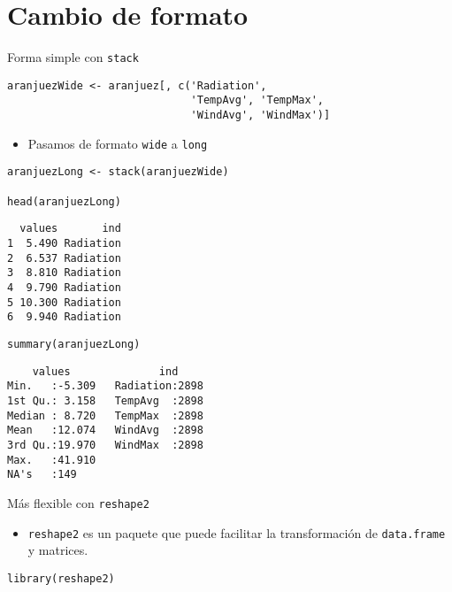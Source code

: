 \documentclass[xcolor={usenames,svgnames,dvipsnames}]{beamer}
\begin{document}
\section{Cambio de formato}
\label{sec:org9dc9fd1}
\begin{frame}[fragile,label={sec:org29a83c6}]{Forma simple con \texttt{stack}}
 \lstset{language=r,label= ,caption= ,captionpos=b,numbers=none}
\begin{lstlisting}
aranjuezWide <- aranjuez[, c('Radiation',
                             'TempAvg', 'TempMax',
                             'WindAvg', 'WindMax')]
\end{lstlisting}

\begin{itemize}
\item Pasamos de formato \texttt{wide} a \texttt{long}
\end{itemize}
\lstset{language=r,label= ,caption= ,captionpos=b,numbers=none}
\begin{lstlisting}
aranjuezLong <- stack(aranjuezWide)

head(aranjuezLong)
\end{lstlisting}

\begin{verbatim}
  values       ind
1  5.490 Radiation
2  6.537 Radiation
3  8.810 Radiation
4  9.790 Radiation
5 10.300 Radiation
6  9.940 Radiation
\end{verbatim}

\lstset{language=r,label= ,caption= ,captionpos=b,numbers=none}
\begin{lstlisting}
summary(aranjuezLong)
\end{lstlisting}

\begin{verbatim}
    values              ind      
Min.   :-5.309   Radiation:2898  
1st Qu.: 3.158   TempAvg  :2898  
Median : 8.720   TempMax  :2898  
Mean   :12.074   WindAvg  :2898  
3rd Qu.:19.970   WindMax  :2898  
Max.   :41.910                   
NA's   :149
\end{verbatim}
\end{frame}

\begin{frame}[fragile,label={sec:orgb161378}]{Más flexible con \texttt{reshape2}}
 \begin{itemize}
\item \texttt{reshape2} es un paquete que puede facilitar la transformación de \texttt{data.frame} y matrices.
\end{itemize}

\lstset{language=r,label= ,caption= ,captionpos=b,numbers=none}
\begin{lstlisting}
library(reshape2)
\end{lstlisting}
\end{frame}
\end{document}
